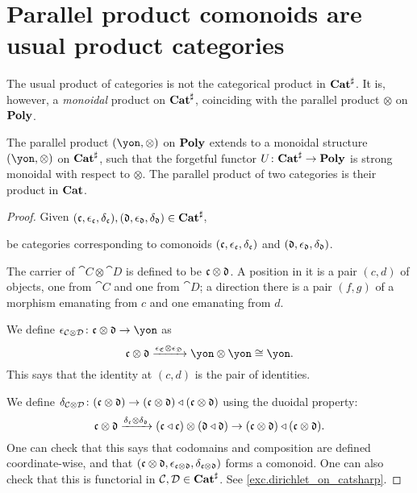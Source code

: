 \documentclass[Book-Poly]{subfiles}
\begin{document}
\section{Parallel product comonoids are usual product categories}

The usual product of categories is not the categorical product in $\mathbf{Cat}^\sharp$. %
It is, however, a \emph{monoidal} product on $\mathbf{Cat}^\sharp$, coinciding with the parallel product $\otimes$ on $\mathbf{Poly}$.

\begin{proposition}\label{prop.dirichlet_on_catsharp}
The parallel product $(\yon,\otimes)$ on $\mathbf{Poly}$ extends to a monoidal structure $(\yon,\otimes)$ on $\mathbf{Cat}^\sharp$, such that the forgetful functor
$U\colon\mathbf{Cat}^\sharp\to\mathbf{Poly}$
is strong monoidal with respect to $\otimes$.
The parallel product of two categories is their product in $\mathbf{Cat}$.
\end{proposition}
\begin{proof}
Given $(\mathfrak{c},\epsilon_{\mathfrak{c}},\delta_{\mathfrak{c}}),(\mathfrak{d},\epsilon_{\mathfrak{d}},\delta_{\mathfrak{d}})\in\mathbf{Cat}^\sharp$, 

be categories corresponding to comonoids $(\mathfrak{c},\epsilon_{\mathfrak{c}},\delta_{\mathfrak{c}})$ and $(\mathfrak{d},\epsilon_{\mathfrak{d}},\delta_{\mathfrak{d}})$.



The carrier of $\cat{C}\otimes\cat{D}$ is defined to be $\mathfrak{c}\otimes\mathfrak{d}$. A position in it is a pair $(c,d)$ of objects, one from $\cat{C}$ and one from $\cat{D}$; a direction there is a pair $(f,g)$ of a morphism emanating from $c$ and one emanating from $d$. 

We define $\epsilon_{\cat{C}\otimes\cat{D}}\colon\ema{c}\otimes\ema{d}\to\yon$ as
\[
\ema{c}\otimes\ema{d}\To{\epsilon_{\ema{C}}\otimes\epsilon_{\ema{D}}}\yon\otimes\yon\cong\yon.
\]
This says that the identity at $(c,d)$ is the pair of identities.

We define $\delta_{\mathcal{C}\otimes\mathcal{D}}\colon(\mathfrak{c}\otimes\mathfrak{d})\to(\mathfrak{c}\otimes\mathfrak{d})\mathbin{\triangleleft}(\mathfrak{c}\otimes\mathfrak{d})$ using the duoidal property:
\[
\mathfrak{c}\otimes\mathfrak{d}\xrightarrow{\delta_{\mathfrak{c}}\otimes\delta_{\mathfrak{d}}}(\mathfrak{c}\mathbin{\triangleleft}\mathfrak{c})\otimes(\mathfrak{d}\mathbin{\triangleleft}\mathfrak{d})\to(\mathfrak{c}\otimes\mathfrak{d})\mathbin{\triangleleft}(\mathfrak{c}\otimes\mathfrak{d}).
\]
One can check that this says that codomains and composition are defined coordinate-wise, and that $(\mathfrak{c}\otimes\mathfrak{d},\epsilon_{\mathfrak{c}\otimes\mathfrak{d}},\delta_{\mathfrak{c}\otimes\mathfrak{d}})$ forms a comonoid. One can also check that this is functorial in $\mathcal{C},\mathcal{D}\in\mathbf{Cat}^\sharp$. See \cref{exc.dirichlet_on_catsharp}.
\end{proof}
\end{document}
